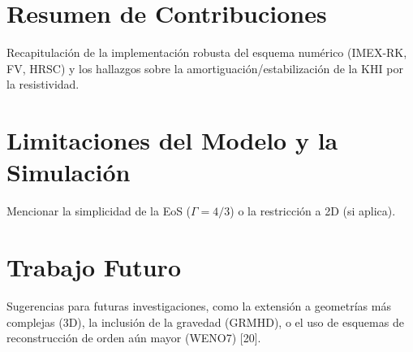 \section{Resumen de Contribuciones}
    Recapitulación de la implementación robusta del esquema numérico (IMEX-RK, FV, HRSC) y los hallazgos sobre la amortiguación/estabilización de la KHI por la resistividad.
\section{Limitaciones del Modelo y la Simulación}
    Mencionar la simplicidad de la EoS ($\Gamma=4/3$) o la restricción a 2D (si aplica).
\section{Trabajo Futuro}
    Sugerencias para futuras investigaciones, como la extensión a geometrías más complejas (3D), la inclusión de la gravedad (GRMHD), o el uso de esquemas de reconstrucción de orden aún mayor (WENO7) [20].
